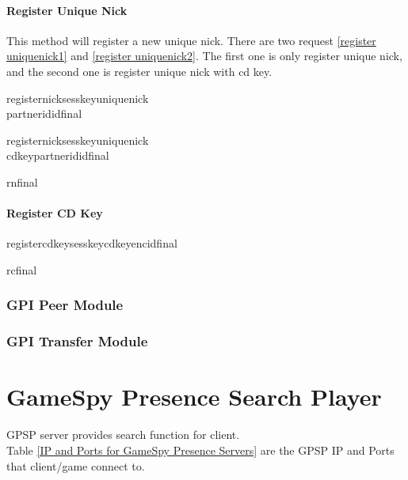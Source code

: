 \documentclass[oneside,titlepage,a4paper]{Definition/retrospy} %
\begin{document}
\subsubsection{Register Unique Nick}
This method will register a new unique nick. There are two request \ref{register uniquenick1} and \ref{register uniquenick2}. The first one is only register unique nick, and the second one is register unique nick with cd key.
\ClientRequest
\begin{mybox}[label=register uniquenick1]
	\tbs registernick\tbs\tbs sesskey\tbs<session key>\tbs uniquenick\tbs<unique nick>\\\tbs partnerid\tbs<partner id>\tbs id\tbs<operation id>\tbs final\tbs
\end{mybox}
\begin{mybox}[label=register uniquenick2]
	\tbs registernick\tbs\tbs sesskey\tbs<session key>\tbs uniquenick\tbs<unique nick>\\\tbs cdkey\tbs<cd key>\tbs partnerid\tbs<partner id>\tbs id\tbs<operation id>\tbs final\tbs
\end{mybox}

\ServerResponse
\begin{mybox}
	\tbs rn\tbs final\tbs
\end{mybox}


\subsubsection{Register CD Key}
\ClientRequest
\begin{mybox}
	\tbs registercdkey\tbs\tbs sesskey\tbs<session key>\tbs cdkeyenc\tbs<cd key enc string>\tbs id\tbs <operation id>\tbs final\tbs
\end{mybox}
\ServerResponse
\begin{mybox}
	\tbs rc\tbs final\tbs
\end{mybox}
\subsection{GPI Peer Module}
\subsection{GPI Transfer Module}



\chapter{GameSpy Presence Search Player}
GPSP server provides search function for client.\\
Table \ref{IP and Ports for GameSpy Presence Servers} are the GPSP IP and Ports that client/game connect to.
\end{document}
